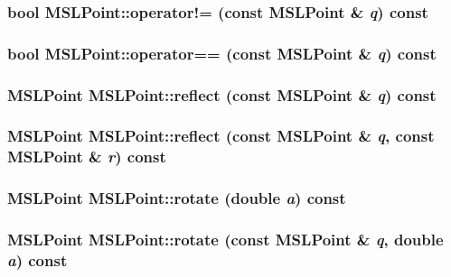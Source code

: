 \subsubsection{\setlength{\rightskip}{0pt plus 5cm}bool MSLPoint::operator!= (const MSLPoint \& {\em q}) const\hspace{0.3cm}{\tt  [inline]}}\label{class_MSLPoint_a22}


\subsubsection{\setlength{\rightskip}{0pt plus 5cm}bool MSLPoint::operator== (const MSLPoint \& {\em q}) const}\label{class_MSLPoint_a21}


\subsubsection{\setlength{\rightskip}{0pt plus 5cm}MSLPoint MSLPoint::reflect (const MSLPoint \& {\em q}) const}\label{class_MSLPoint_a20}


\subsubsection{\setlength{\rightskip}{0pt plus 5cm}MSLPoint MSLPoint::reflect (const MSLPoint \& {\em q}, const MSLPoint \& {\em r}) const}\label{class_MSLPoint_a19}


\subsubsection{\setlength{\rightskip}{0pt plus 5cm}MSLPoint MSLPoint::rotate (double {\em a}) const}\label{class_MSLPoint_a16}


\subsubsection{\setlength{\rightskip}{0pt plus 5cm}MSLPoint MSLPoint::rotate (const MSLPoint \& {\em q}, double {\em a}) const}\label{class_MSLPoint_a15}


